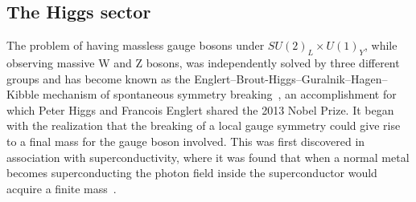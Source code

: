 \subsection{The Higgs sector}
\label{sec:theory:higgs}
The problem of having massless gauge bosons under $SU(2)_L \times U(1)_Y$, while observing massive W and Z bosons, was independently solved by three different groups and has become known as the Englert–Brout-Higgs–Guralnik–Hagen–Kibble mechanism of spontaneous symmetry breaking~\cite{PhysRevLett.13.321,PhysRevLett.13.508,PhysRevLett.13.585}, an accomplishment for which Peter Higgs and Francois Englert shared the 2013 Nobel Prize.\newline
It began with the realization that the breaking of a local gauge symmetry could give rise to a final mass for the gauge boson involved. This was first discovered in association with superconductivity, where it was found that when a normal metal becomes superconducting the photon field inside the superconductor would acquire a finite mass~\cite{PhysRev.110.827}.

